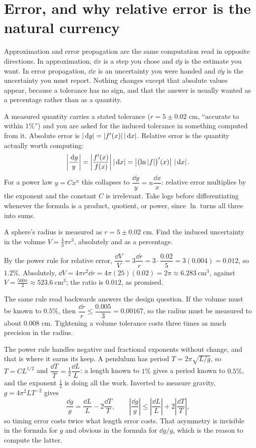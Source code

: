 \section{Error, and why relative error is the natural currency}

Approximation and error propagation are the same computation read in opposite directions. In approximation, $\dd x$ is a step you chose and $\dd y$ is the estimate you want. In error propagation, $\dd x$ is an uncertainty you were handed and $\dd y$ is the uncertainty you must report. Nothing changes except that absolute values appear, because a tolerance has no sign, and that the answer is usually wanted as a percentage rather than as a quantity.

\cue A measured quantity carries a stated tolerance ($r=5\pm0.02$ cm, ``accurate to within $1\%$'') and you are asked for the induced tolerance in something computed from it.
\method Absolute error is $\left\lvert \,\mathrm{d} y\right\rvert=\left\lvert f'(x)\right\rvert\left\lvert \,\mathrm{d} x\right\rvert$. Relative error is the quantity actually worth computing:
\[\left|\frac{\,\mathrm{d} y}{y}\right|=\left|\frac{f'(x)}{f(x)}\right|\left\lvert \,\mathrm{d} x\right\rvert=\bigl|\bigl(\ln\left\lvert f\right\rvert\bigr)'(x)\bigr|\,\left\lvert \,\mathrm{d} x\right\rvert.\]
For a power law $y=Cx^{n}$ this collapses to $\dfrac{\dd y}{y}=n\dfrac{\dd x}{x}$: relative error multiplies by the exponent and the constant $C$ is irrelevant. Take logs before differentiating whenever the formula is a product, quotient, or power, since $\ln$ turns all three into sums.

\begin{worked}
A sphere's radius is measured as $r=5\pm0.02$ cm. Find the induced uncertainty in the volume $V=\tfrac43\pi r^{3}$, absolutely and as a percentage.

By the power rule for relative error, $\dfrac{\dd V}{V}=3\dfrac{\dd r}{r}=3\cdot\dfrac{0.02}{5}=3(0.004)=0.012$, so $1.2\%$. Absolutely, $\dd V=4\pi r^{2}\dd r=4\pi(25)(0.02)=2\pi\approx6.283\ \mathrm{cm}^{3}$, against $V=\tfrac{500\pi}{3}\approx523.6\ \mathrm{cm}^{3}$; the ratio is $0.012$, as promised.

The same rule read backwards answers the design question. If the volume must be known to $0.5\%$, then $\dfrac{\dd r}{r}\leq\dfrac{0.005}{3}=0.00167$, so the radius must be measured to about $0.008$ cm. Tightening a volume tolerance costs three times as much precision in the radius.

The power rule handles negative and fractional exponents without change, and that is where it earns its keep. A pendulum has period $T=2\pi\sqrt{L/g}$, so $T=CL^{1/2}$ and $\dfrac{\dd T}{T}=\tfrac12\dfrac{\dd L}{L}$: a length known to $1\%$ gives a period known to $0.5\%$, and the exponent $\tfrac12$ is doing all the work. Inverted to measure gravity, $g=4\pi^{2}LT^{-2}$ gives
\[\frac{\dd g}{g}=\frac{\dd L}{L}-2\frac{\dd T}{T},\qquad \left|\frac{\dd g}{g}\right|\leq\left|\frac{\dd L}{L}\right|+2\left|\frac{\dd T}{T}\right|,\]
so timing error costs twice what length error costs. That asymmetry is invisible in the formula for $g$ and obvious in the formula for $\dd g/g$, which is the reason to compute the latter.
\end{worked}

